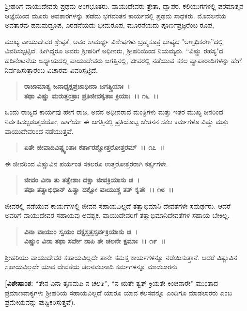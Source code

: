 ಶ‍್ರೀಹರಿಗೆ ವಾಯುದೇವರು ಪ್ರಥಮ ಅಂಗಭೂತರು. ವಾಯುದೇವರು ತ್ರೇತಾ, ದ್ವಾಪರ, ಕಲಿಯುಗಗಳಲ್ಲಿ ಪರಮಾತ್ಮನ ಆಜ್ಞೆಯಿಂದ ಮೂರು ಅವತಾರಗಳನ್ನು ಪಡೆದು ಭಗವಂತನ ಕಾರ್ಯದಲ್ಲಿ ಪ್ರಥಮ ಸಾಧಕರು. ಮೊದಲನೆಯ ಅವತಾರವು ಹನುಮದ್ರೂಪ, ಎರಡನೆಯದು ಭೀಮರೂಪ, ಮೂರನೆಯದು ಪೂರ್ಣಪ್ರಜ್ಞರೆಂಬ ರೂಪ,

ಮುಖ್ಯ ವಾಯುದೇವರ ಶ್ರೇಷ್ಠತೆ, ಅವರ ಸಾಮರ್ಥ್ಯ ವಿಶೇಷಗಳು ಬ್ರಹ್ಮಸೂತ್ರ ಭಾಷ್ಯದ "ಅಣ್ವಧಿಕರಣ”ದಲ್ಲಿ ವಿವರಿಸಲ್ಪಟ್ಟಿವೆ. ಹೀಗಿದ್ದರೂ ಅವರು ಶ‍್ರೀಹರಿಗೆ ಅಧೀನರು, ಶ‍್ರೀಹರಿಯಿಂದ ನಿಯಮ್ಯರು. “ವಿಷ್ಣು ರಹಸ್ಯ"ದ ಹದಿನೆಂಟನೆಯ ಅಧ್ಯಾಯದಲ್ಲಿ ವಾಯುದೇವರು ಜಗತ್ತಿನಲ್ಲಿ, ಜೀವರಲ್ಲಿ ನಡೆಯುವ ಸಕಲ ವ್ಯಾಪಾರಾದಿಗಳನ್ನು ಹೇಗೆ ನಿರ್ವಹಿಸುತ್ತಾರೆಂಬ ವಿಚಾರವು ವಿವರಿಸ್ಪಟ್ಟಿದೆ.

\begin{verse}
\textbf{ರಾಜಾಮಾತ್ಯ ಜನಾಧ್ಯಕ್ಷಪ್ರಜಾಧೀನಾ ಜಗತ್ಕ್ರಿಯಾಃ~।}\\\textbf{ತಥಾ ವಿಷ್ಣು ಮರುತ್ತಂತ್ರಾಃ ಪ್ರತಿಜೀವಕೃತಾಃ ಕ್ರಿಯಾಃ~।। ೧೬~।।}
\end{verse}

ಒಂದು ರಾಜ್ಯದ ಕಾರ್ಯವು ಹೇಗೆ ರಾಜ, ಅವನ ಅಧೀನರಾದ ಮಂತ್ರಿಗಳು ಮತ್ತು ಇತರ ಮುಖ್ಯ ಜನರಿಂದ ನಿರ್ವಹಿಸಲ್ಪಡುತ್ತದೆಯೋ, ಹಾಗೆಯೇ ಈ ಜಗತ್ತಿನಲ್ಲಿ ಪ್ರತಿಯೊಬ್ಬ ಚೇತನನ ಸಕಲ ಕರ್ಮಗಳೂ ವಿಷ್ಣು ಮತ್ತು ವಾಯುದೇವರಿಂದ ನಡೆಯುತ್ತವೆ.

\begin{verse}
\textbf{ಏತೇ ಜೀವಾದಿವಿಷ್ಣ್ವಂತಾಃ ಕರ್ತಾರಶ್ಚೋತ್ತರೋತ್ತರಮ್~।। ೧೭~।।}
\end{verse}

ಈ ಜೀವರಿಂದ ವಿಷ್ಣುವಿನ ಪರ್ಯಂತ ಸಕಲರೂ ಉತ್ತರೋತ್ತರರಾಗಿ ಕರ್ತೃಗಳೇ.

\begin{verse}
\textbf{ಜೀವಂ ವಿನಾ ತು ತತ್ವೇಶಾಃ ದಕ್ಷಾ ಜೀವಕ್ರಿಯಾಸು ಚ~।}\\\textbf{ತಥಾ ತತ್ವಾಭಿಧಾನ್ ಹಿತ್ವಾ ದಕ್ಷೋ ವಾಯುಶ್ಚ ತತ್ ಕೃತೌ~।। ೧೮~।।}
\end{verse}

ಜೀವರಲ್ಲಿ ನಡೆಯುವ ಕಾರ್ಯಗಳಲ್ಲಿ ಜೀವನ ಸಹಾಯವಿಲ್ಲದೆ ತತ್ವಾಭಿಮಾನಿ ದೇವತೆಗಳೇ ಸಮರ್ಥರು. ಆದರೆ ಅವರಿಗೆ ವಾಯುದೇವರ ಸಹಾಯವು ಅವಶ್ಯಕ. ವಾಯುದೇವರಿಗೆ ತತ್ವಾಭಿಮಾನಿದೇವತೆಗಳ ಸಹಾಯ ಬೇಕಿಲ್ಲ.

\begin{verse}
\textbf{ವಿನಾ ವಾಯುಂ ಸ್ವಯಂ ದಕ್ಷಸ್ತತ್ತಸ್ಸರ್ವಕ್ರಿಯಾಸು ಚ~।}\\\textbf{ವಿಷ್ಣುಂ ವಿನಾ ತಥಾ ಸರ್ವೇ ನಾಪಿ ತೇ ಚಲನೇ ಕ್ಷಮಾಃ~।। ೧೯~।।}
\end{verse}

ಶ‍್ರೀಹರಿಯು ವಾಯುದೇವರ ಸಹಾಯವಿಲ್ಲದೇ ತಾನೇ ಸಮಸ್ತ ಕಾರ್ಯಗಳನ್ನೂ ನಡೆಯಿಸುತ್ತಾನೆ. ಆದರೆ ವಿಷ್ಣುವಿನ ಸಹಾಯವಿಲ್ಲದೇ ಯಾವ ದೇವತೆಯ ಚಲನವಲನಾದಿ ಕರ್ಮಗಳನ್ನೂ ಮಾಡಲಾರನು.

\textbf{[ವಿಶೇಷಾಂಶ:} “ತೇನ ವಿನಾ ತೃಣಮಪಿ ನ ಚಲತಿ”, “ನ ಋತೇ ತ್ವತ್ ಕ್ರಿಯತೇ ಕಿಂಚನಾರೇ'' ಮುಂತಾದ ಪ್ರಮಾಣವಾಕ್ಯಗಳು ಶ‍್ರೀಹರಿಯ ಸಹಾಯವಿಲ್ಲದೆ ಯಾರೂ ಯಾವ ಕೆಲಸವನ್ನೂ ಎಂದಿಗೂ ಮಾಡಲಾರರು ಎಂಬ ಪ್ರಮೇಯವನ್ನು ಪುಷ್ಟಿಕರಿಸುತ್ತವೆ).

